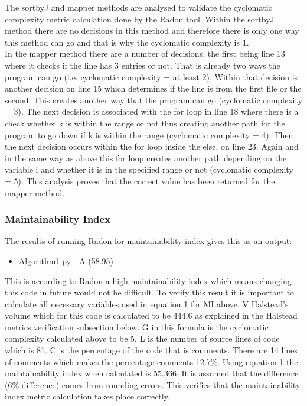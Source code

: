 \documentclass[10.5pt,journal, a4paper]{IEEEtran}
\begin{document}
\noindent 
The sortbyJ and mapper methods are analysed to validate the cyclomatic complexity metric calculation done by the Radon tool. Within the sortbyJ method there are no decisions in this method and therefore there is only one way this method can go and that is why the cyclomatic complexity is 1. \\

\noindent 
In the mapper method there are a number of decisions, the first being line 13 where it checks if the line has 3 entries or not. That is already two ways the program can go (i.e. cyclomatic complexity = at least 2). Within that decision is another decision on line 15 which determines if the line is from the first file or the second. This creates another way that the program can go (cyclomatic complexity = 3). The next decision is associated with the for loop in line 18 where there is a check whether k is within the range or not thus creating another path for the program to go down if k is within the range (cyclomatic complexity = 4). Then the next decision occurs within the for loop inside the else, on line 23. Again and in the same way as above this for loop creates another path depending on the variable i and whether it is in the specified range or not (cyclomatic complexity = 5). This analysis proves that the correct value has been returned for the mapper method. 



\subsubsection{Maintainability Index}
\noindent
The results of running Radon for maintainability index gives this as an output:
\begin{itemize}
\item Algorithm1.py - A (58.95)
\end{itemize}

\noindent
This is according to Radon a high maintainability index which means changing this code in future would not be difficult. To verify this result it is important to calculate all necessary variables used in equation 1 for MI above. V Halstead's volume which for this code is calculated to be 444.6 as explained in the Halstead metrics verification subsection below. G in this formula is the cyclomatic complexity calculated above to be 5. L is the number of source lines of code which is 81. C is the percentage of the code that is comments. There are 14 lines of comments which makes the percentage comments 12.7\%. Using equation 1 the maintainability index when calculated is 55.366. It is assumed that the difference (6\% difference) comes from rounding errors. This verifies that the maintainability index metric calculation takes place correctly. 
\end{document}
